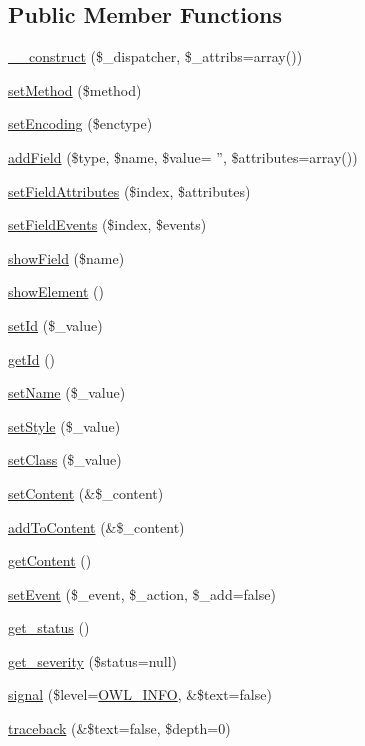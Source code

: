 \subsection*{Public Member Functions}
\begin{DoxyCompactItemize}
\item 
\hyperlink{classForm_ae90293f5520279d6c18f416d3f883ac8}{\_\-\_\-construct} (\$\_\-dispatcher, \$\_\-attribs=array())
\item 
\hyperlink{classForm_a2dc6461afb09effeefe444847ad9b562}{setMethod} (\$method)
\item 
\hyperlink{classForm_a2b1f9bb23c4da0558002b62f60b55078}{setEncoding} (\$enctype)
\item 
\hyperlink{classForm_a880197a858a70581146d6f0d275eff02}{addField} (\$type, \$name, \$value= '', \$attributes=array())
\item 
\hyperlink{classForm_a83cd5bed7649ecfe202dd97a8129f6f8}{setFieldAttributes} (\$index, \$attributes)
\item 
\hyperlink{classForm_a011360ce04a237f5609446f3134ec32c}{setFieldEvents} (\$index, \$events)
\item 
\hyperlink{classForm_a29e01263557e33fab02ee5c3aaa0b3f5}{showField} (\$name)
\item 
\hyperlink{classForm_aeac5855c8b2406c34090a621d59df664}{showElement} ()
\item 
\hyperlink{classBaseElement_a0c1ce3d1684ecb78960cf7a97278494e}{setId} (\$\_\-value)
\item 
\hyperlink{classBaseElement_a4a7aa583ee21af392908d7fd42fde790}{getId} ()
\item 
\hyperlink{classBaseElement_a39bafb3609d10048920c20242c2a04c5}{setName} (\$\_\-value)
\item 
\hyperlink{classBaseElement_a6b2b9ff69f6e92db82f91d9c55cda697}{setStyle} (\$\_\-value)
\item 
\hyperlink{classBaseElement_af6597b30fa9798878f6290271043dfa2}{setClass} (\$\_\-value)
\item 
\hyperlink{classBaseElement_a164a9c6e4ee68afa0ad343942ba54d28}{setContent} (\&\$\_\-content)
\item 
\hyperlink{classBaseElement_abd48eef64ca4f419f26d66a0c0419908}{addToContent} (\&\$\_\-content)
\item 
\hyperlink{classBaseElement_af8c86b93bcdcfbc415bf96c622dc5516}{getContent} ()
\item 
\hyperlink{classBaseElement_ad5789f45f16aaa144716ee8558069c31}{setEvent} (\$\_\-event, \$\_\-action, \$\_\-add=false)
\item 
\hyperlink{class__OWL_a99ec771fa2c5c279f80152cc09e489a8}{get\_\-status} ()
\item 
\hyperlink{class__OWL_adf9509ef96858be7bdd9414c5ef129aa}{get\_\-severity} (\$status=null)
\item 
\hyperlink{class__OWL_a51ba4a16409acf2a2f61f286939091a5}{signal} (\$level=\hyperlink{owl_8severitycodes_8php_a139328861128689f2f4def6a399d9057}{OWL\_\-INFO}, \&\$text=false)
\item 
\hyperlink{class__OWL_aa29547995d6741b7d2b90c1d4ea99a13}{traceback} (\&\$text=false, \$depth=0)
\end{DoxyCompactItemize}
